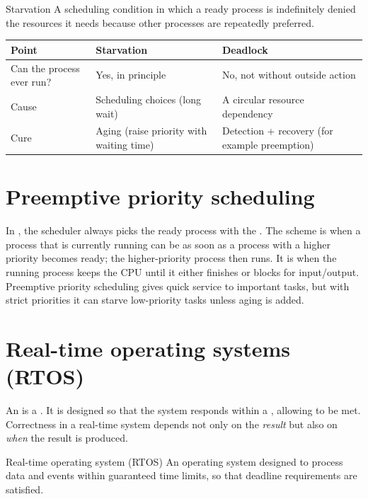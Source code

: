 \begin{definitionbox}{Starvation}
A scheduling condition in which a ready process is indefinitely denied the
resources it needs because other processes are repeatedly preferred.
\end{definitionbox}

\begin{center}
\begin{tabular}{p{}p{}p{}}
\toprule
\textbf{Point} & \textbf{Starvation} & \textbf{Deadlock} \\
\midrule
Can the process ever run? & Yes, in principle & No, not without outside action \\
Cause & Scheduling choices (long wait) & A circular resource dependency \\
Cure & Aging (raise priority with waiting time) & Detection + recovery (for example preemption) \\
\bottomrule
\end{tabular}
\end{center}

\section{Preemptive priority scheduling}
In , the scheduler always picks the ready process with
the . The scheme is  when a process that
is currently running can be  as soon as a process with a
higher priority becomes ready; the higher-priority process then runs. It is
 when the running process keeps the CPU until it either
finishes or blocks for input/output. Preemptive priority scheduling gives
quick service to important tasks, but with strict priorities it can starve
low-priority tasks unless aging is added.

\section{Real-time operating systems (RTOS)}
An  is a . It is designed so that
the system responds within a , allowing  to be
met. Correctness in a real-time system depends not only on the \emph{result}
but also on \emph{when} the result is produced.

\begin{definitionbox}{Real-time operating system (RTOS)}
An operating system designed to process data and events within guaranteed
time limits, so that deadline requirements are satisfied.
\end{definitionbox}

